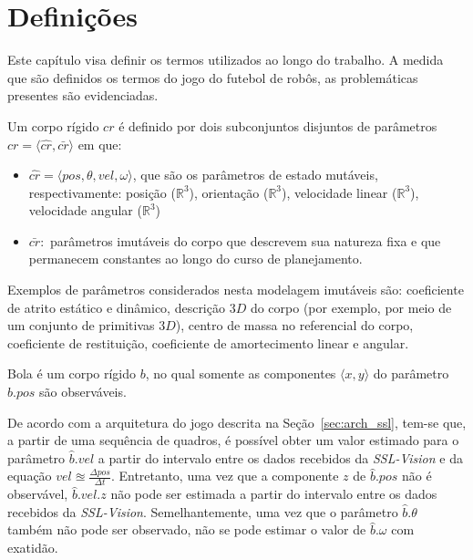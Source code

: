 \section{Definições}\label{sec:defs}

Este capítulo visa definir os termos utilizados ao longo do
trabalho. A medida que são definidos os termos do jogo do
futebol de robôs, as problemáticas presentes são evidenciadas.

\begin{defi}
  Um corpo rígido $cr$ é definido por dois subconjuntos disjuntos
  de parâmetros $cr= \langle \hat{cr}, \bar{cr} \rangle$ em que:
  \begin{itemize}
    \item $\hat{cr} = \langle pos, \theta, vel, \omega \rangle$,
    que são os parâmetros de estado mutáveis, respectivamente:
    posição ($\mathbb{R} ^{3}$), orientação ($\mathbb{R} ^{3}$),
    velocidade linear ($\mathbb{R} ^{3}$), velocidade angular
    ($\mathbb{R} ^{3}$)

    \item $\bar{cr} :$ parâmetros imutáveis do corpo que descrevem sua
    natureza fixa e que permanecem constantes ao longo do curso de 
    planejamento.
  \end{itemize}
\end{defi}

  Exemplos de parâmetros considerados nesta modelagem imutáveis são:
  coeficiente de atrito estático e dinâmico, descrição $3D$ do corpo
  (por exemplo, por meio de um conjunto de primitivas $3D$), centro de
  massa no referencial do corpo, coeficiente de restituição,
  coeficiente de amortecimento linear e angular.

\begin{defi}[Bola]\label{def:bola}
  Bola é um corpo rígido $b$, no qual somente as componentes
  $\langle x,y \rangle$ do parâmetro $\hat{b}.pos$ são
  observáveis.
\end{defi}

  De acordo com a arquitetura do jogo descrita na Seção~\ref{sec:arch_ssl},
  tem-se que, a partir de uma sequência
  de quadros, é possível obter um valor estimado para o parâmetro
  $\hat{b}.vel$ a partir do intervalo entre os dados recebidos
  da \textit{SSL-Vision} e da equação $ vel \approxeq 
  \frac{\Delta pos}{\Delta t} $. Entretanto, uma vez que a componente
  $z$ de $\hat{b}.pos$ não é observável, $\hat{b}.vel.z$ 
  não pode ser estimada a partir do intervalo entre os dados recebidos
  da \textit{SSL-Vision}. Semelhantemente,  uma vez que o
  parâmetro $\hat{b}.\theta$ também não pode ser observado,
  não se pode estimar o valor de $\hat{b}.\omega$ com exatidão.

